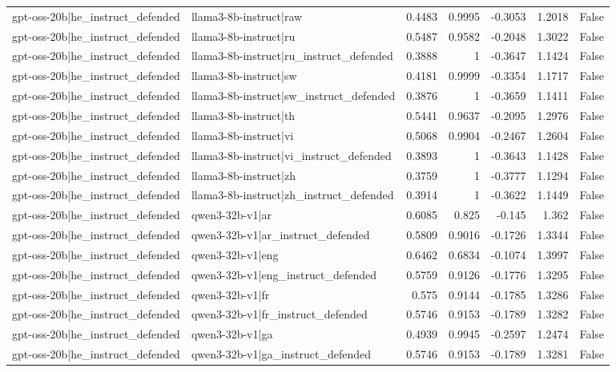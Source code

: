 \begin{table}
\begin{tabular}{l l r r r r l}
gpt-oss-20b|he_instruct_defended & llama3-8b-instruct|raw & 0.4483 & 0.9995 & -0.3053 & 1.2018 & False \\
gpt-oss-20b|he_instruct_defended & llama3-8b-instruct|ru & 0.5487 & 0.9582 & -0.2048 & 1.3022 & False \\
gpt-oss-20b|he_instruct_defended & llama3-8b-instruct|ru_instruct_defended & 0.3888 & 1 & -0.3647 & 1.1424 & False \\
gpt-oss-20b|he_instruct_defended & llama3-8b-instruct|sw & 0.4181 & 0.9999 & -0.3354 & 1.1717 & False \\
gpt-oss-20b|he_instruct_defended & llama3-8b-instruct|sw_instruct_defended & 0.3876 & 1 & -0.3659 & 1.1411 & False \\
gpt-oss-20b|he_instruct_defended & llama3-8b-instruct|th & 0.5441 & 0.9637 & -0.2095 & 1.2976 & False \\
gpt-oss-20b|he_instruct_defended & llama3-8b-instruct|vi & 0.5068 & 0.9904 & -0.2467 & 1.2604 & False \\
gpt-oss-20b|he_instruct_defended & llama3-8b-instruct|vi_instruct_defended & 0.3893 & 1 & -0.3643 & 1.1428 & False \\
gpt-oss-20b|he_instruct_defended & llama3-8b-instruct|zh & 0.3759 & 1 & -0.3777 & 1.1294 & False \\
gpt-oss-20b|he_instruct_defended & llama3-8b-instruct|zh_instruct_defended & 0.3914 & 1 & -0.3622 & 1.1449 & False \\
gpt-oss-20b|he_instruct_defended & qwen3-32b-v1|ar & 0.6085 & 0.825 & -0.145 & 1.362 & False \\
gpt-oss-20b|he_instruct_defended & qwen3-32b-v1|ar_instruct_defended & 0.5809 & 0.9016 & -0.1726 & 1.3344 & False \\
gpt-oss-20b|he_instruct_defended & qwen3-32b-v1|eng & 0.6462 & 0.6834 & -0.1074 & 1.3997 & False \\
gpt-oss-20b|he_instruct_defended & qwen3-32b-v1|eng_instruct_defended & 0.5759 & 0.9126 & -0.1776 & 1.3295 & False \\
gpt-oss-20b|he_instruct_defended & qwen3-32b-v1|fr & 0.575 & 0.9144 & -0.1785 & 1.3286 & False \\
gpt-oss-20b|he_instruct_defended & qwen3-32b-v1|fr_instruct_defended & 0.5746 & 0.9153 & -0.1789 & 1.3282 & False \\
gpt-oss-20b|he_instruct_defended & qwen3-32b-v1|ga & 0.4939 & 0.9945 & -0.2597 & 1.2474 & False \\
gpt-oss-20b|he_instruct_defended & qwen3-32b-v1|ga_instruct_defended & 0.5746 & 0.9153 & -0.1789 & 1.3281 & False \\

\end{tabular}
\end{table}
